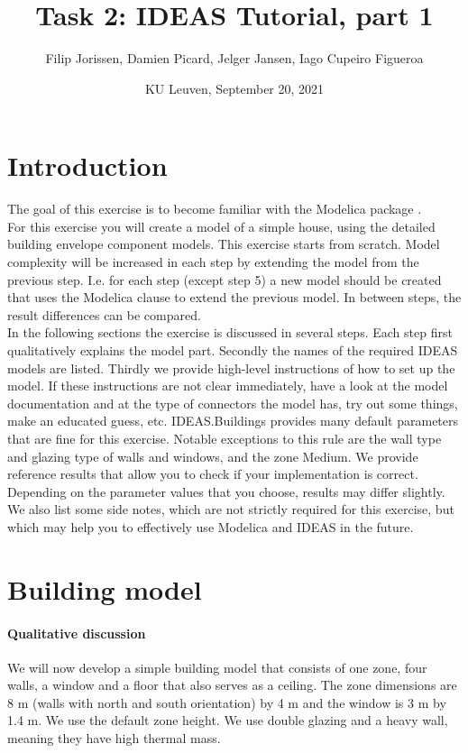\documentclass[10pt,a4paper]{article}
\begin{document}
\title{Task 2: IDEAS Tutorial, part 1}
\author{Filip Jorissen, Damien Picard, Jelger Jansen, Iago Cupeiro Figueroa}
\date{KU Leuven, September 20, 2021}
\maketitle


\doclicenseThis



\section*{Introduction}
The goal of this exercise is to become familiar with the 
Modelica package . \\

For this exercise you will create a model of a simple house,
using the detailed building envelope component models.
This exercise starts from scratch. 
Model complexity will be increased in each step by 
extending the model from the previous step. 
I.e. for each step (except step 5) a new model should be created that uses
the Modelica  clause to extend the previous model.
In between steps, the result differences can be compared.\\


In the following sections the exercise is discussed 
in several steps. 
Each step first qualitatively explains the model part.
Secondly the names of the required IDEAS models 
are listed.
Thirdly we provide high-level instructions of how to
set up the model.
If these instructions are not clear immediately, 
have a look at the model documentation and at the type of
connectors the model has, 
try out some things, 
make an educated guess, etc.
IDEAS.Buildings provides many default parameters that are fine for
this exercise. Notable exceptions to this rule are
the wall type and glazing type of walls and windows, and the zone Medium.
We provide reference results that allow you to check
if your implementation is correct. 
Depending on the parameter values that you choose, results
may differ slightly.
We also list some side notes, which are not strictly required for this
exercise, but which may help you to effectively use Modelica
and IDEAS in the future.

\section{Building  model}
\paragraph{Qualitative discussion}
We will now develop a simple building model that consists of one zone,
four walls, a window and a floor that also serves as a ceiling.
The zone dimensions are 8 m (walls with north and south orientation) by 4 m and the window is 3 m by 1.4 m. We use the default zone height.
We use double glazing and a heavy wall, meaning they
have high thermal mass.
\end{document}
